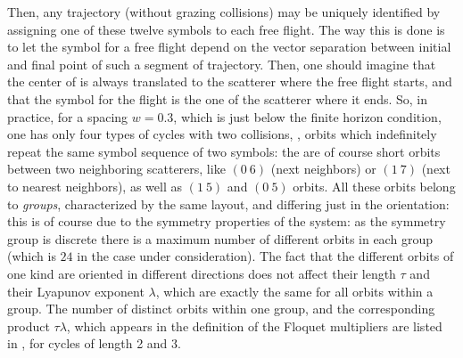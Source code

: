 {Then, any trajectory (without grazing collisions) may be uniquely
identified by assigning one of these twelve symbols to each free
flight. The way this is done is to let the symbol for a free flight
depend on the vector separation between initial and final point of
such a segment of trajectory. Then, one should imagine that the center
of  is always translated to the scatterer where the
free flight starts, and that the symbol for the flight is the one of
the scatterer where it ends. So, in practice, for a spacing $w=0.3$,
which is just below the finite horizon condition, one has only four
types of cycles with two collisions, \ie, orbits which indefinitely
repeat the same symbol sequence of two symbols:
the are of course short orbits between two neighboring scatterers,
like $(0~6)$ (next neighbors) or $(1~7)$ (next to nearest neighbors),
as well as $(1~5)$ and $(0~5)$ orbits. All these orbits belong to {\em
groups}, characterized by the same layout, and differing just in the
orientation: this is of course due to the symmetry properties of the
system: as the symmetry group is discrete there is a maximum number of
different orbits in each group (which is $24$ in the case under
consideration).  The fact that the different orbits of one kind are
oriented in different directions does not affect their length $\tau$
and their Lyapunov exponent $\lambda$, which are exactly the same for
all orbits within a group.  The number of distinct orbits within one
group, and the corresponding product $\tau \lambda$, which appears in
the definition of the Floquet multipliers are listed in
, for cycles of length 2 and 3.
%
%
}
